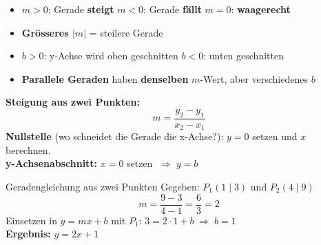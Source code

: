 \documentclass[12pt, a4paper]{article}
\begin{document}
\begin{center}
\end{center}

\begin{merkbox}
\begin{itemize}
  \item $m > 0$: Gerade \textbf{steigt} \quad $m < 0$: Gerade \textbf{f\"allt} \quad $m = 0$: \textbf{waagerecht}
  \item \textbf{Gr\"osseres $|m|$} = steilere Gerade
  \item \textbf{$b > 0$}: y-Achse wird oben geschnitten \quad \textbf{$b < 0$}: unten geschnitten
  \item \textbf{Parallele Geraden} haben \textbf{denselben} $m$-Wert, aber verschiedenes $b$
\end{itemize}
\end{merkbox}

\begin{formulabox}
\textbf{Steigung aus zwei Punkten:}
\[
  \boxed{m = \frac{y_2 - y_1}{x_2 - x_1}}
\]
\textbf{Nullstelle} (wo schneidet die Gerade die x-Achse?): $y = 0$ setzen und $x$ berechnen.\\
\textbf{y-Achsenabschnitt:} $x = 0$ setzen $\;\Rightarrow\; y = b$
\end{formulabox}

\begin{examplebox}{Geradengleichung aus zwei Punkten}
Gegeben: $P_1(1\mid 3)$ und $P_2(4\mid 9)$
\[
  m = \frac{9-3}{4-1} = \frac{6}{3} = 2
\]
Einsetzen in $y = mx + b$ mit $P_1$: \quad $3 = 2\cdot1 + b \;\Rightarrow\; b = 1$\\[0.2cm]
\textbf{Ergebnis:} $\boxed{y = 2x + 1}$
\end{examplebox}
\end{document}
